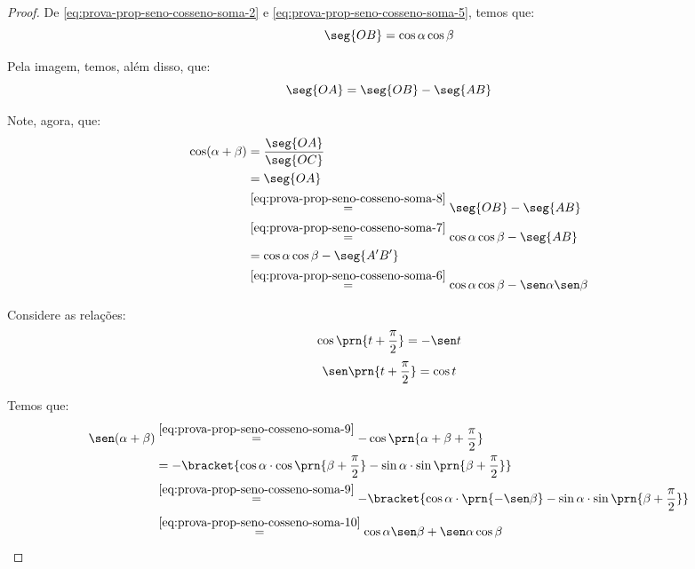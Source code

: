 \begin{proof}
    De \ref{eq:prova-prop-seno-cosseno-soma-2} e \ref{eq:prova-prop-seno-cosseno-soma-5}, temos que:
    \begin{equation}
    \label{eq:prova-prop-seno-cosseno-soma-7}
        \seg{OB} = \cos \alpha \cos \beta
    \end{equation}

    Pela imagem, temos, além disso, que:
    \begin{equation}
    \label{eq:prova-prop-seno-cosseno-soma-8}
        \seg{OA} = \seg{OB} - \seg{AB}
    \end{equation}


    Note, agora, que:
    \begin{align*}
        \cos(\alpha + \beta) &= \frac{\seg{OA}}{\seg{OC}} \\
        &= \seg{OA} \\
        &\stackrel{\ref{eq:prova-prop-seno-cosseno-soma-8}}{=} \seg{OB} - \seg{AB} \\
        &\stackrel{\ref{eq:prova-prop-seno-cosseno-soma-7}}{=}  \cos \alpha \cos \beta - \seg{AB} \\
        &= \cos \alpha \cos \beta - \seg{A^{\prime}B^{\prime}} \\
        &\stackrel{\ref{eq:prova-prop-seno-cosseno-soma-6}}{=}  \cos \alpha \cos \beta - \sen \alpha \sen \beta
    \end{align*}

    Considere as relações:
    \begin{equation}
    \label{eq:prova-prop-seno-cosseno-soma-9}
        \cos\prn{t+\frac \pi 2} = -\sen t
    \end{equation}
    \begin{equation}
    \label{eq:prova-prop-seno-cosseno-soma-10}
        \sen\prn{t+\frac \pi 2} = \cos t
    \end{equation}

    Temos que:
    \begin{align*}
        \sen(\alpha + \beta ) & \stackrel{\ref{eq:prova-prop-seno-cosseno-soma-9}}{=} -\cos\prn{\alpha + \beta + \frac \pi 2} \\
        & = -\bracket{\cos \alpha\cdot \cos\prn{\beta + \frac \pi 2} - \sin \alpha \cdot \sin\prn{\beta + \frac \pi 2}}\\
        &\stackrel{\ref{eq:prova-prop-seno-cosseno-soma-9}}{=} -\bracket{\cos \alpha\cdot \prn{-\sen \beta} - \sin \alpha \cdot \sin\prn{\beta + \frac \pi 2}}\\
        &\stackrel{\ref{eq:prova-prop-seno-cosseno-soma-10}}{=} \cos \alpha \sen \beta + \sen \alpha \cos \beta
    \end{align*}
    


\end{proof}

